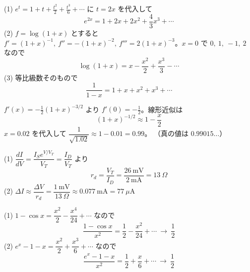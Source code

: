 \documentclass[11pt]{article}
\begin{document}

\problem
\begin{ans}
(1) $e^t = 1 + t + \frac{t^2}{2} + \frac{t^3}{6} + \cdots$ に $t = 2x$ を代入して
\[ e^{2x} = 1 + 2x + 2x^2 + \frac{4}{3}x^3 + \cdots \]
(2) $f = \log(1+x)$ とすると $f' = (1+x)^{-1},\ f'' = -(1+x)^{-2},\ f''' = 2(1+x)^{-3}$。$x=0$ で $0,\ 1,\ -1,\ 2$ なので
\[ \log(1+x) = x - \frac{x^2}{2} + \frac{x^3}{3} - \cdots \]
(3) 等比級数そのもので
\[ \frac{1}{1-x} = 1 + x + x^2 + x^3 + \cdots \]
\end{ans}

\problem
\begin{ans}
$f'(x) = -\frac12(1+x)^{-3/2}$ より $f'(0) = -\frac12$。線形近似は
\[ (1+x)^{-1/2} \approx 1 - \frac{x}{2} \]
$x = 0.02$ を代入して $\dfrac{1}{\sqrt{1.02}} \approx 1 - 0.01 = 0.99$。
（真の値は $0.99015\ldots$）
\end{ans}

\problem
\begin{ans}
(1) $\dfrac{dI}{dV} = \dfrac{I_S e^{V/V_T}}{V_T} = \dfrac{I_D}{V_T}$ より
\[ r_d = \frac{V_T}{I_D} = \frac{26\ \mathrm{mV}}{2\ \mathrm{mA}} = 13\ \Omega \]
(2) $\Delta I \approx \dfrac{\Delta V}{r_d} = \dfrac{1\ \mathrm{mV}}{13\ \Omega} \approx 0.077\ \mathrm{mA} = 77\ \mu\mathrm{A}$
\end{ans}

\problem
\begin{ans}
(1) $1 - \cos x = \dfrac{x^2}{2} - \dfrac{x^4}{24} + \cdots$ なので
\[ \frac{1-\cos x}{x^2} = \frac12 - \frac{x^2}{24} + \cdots \ \to\ \frac12 \]
(2) $e^x - 1 - x = \dfrac{x^2}{2} + \dfrac{x^3}{6} + \cdots$ なので
\[ \frac{e^x-1-x}{x^2} = \frac12 + \frac{x}{6} + \cdots \ \to\ \frac12 \]
\end{ans}
\end{document}
